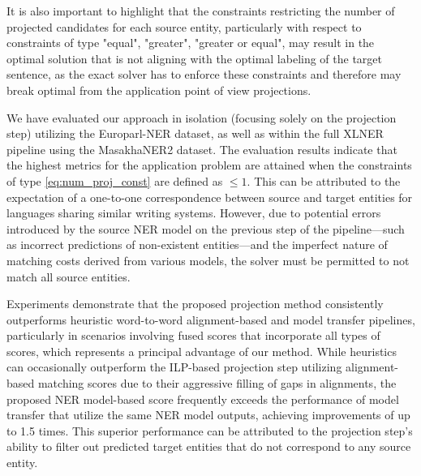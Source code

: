 It is also important to highlight that the constraints restricting the number of projected candidates
for each source entity, particularly with respect to constraints of type "equal", "greater", "greater or equal", may result
in the optimal solution that is not aligning with the optimal labeling of the target sentence, as the
exact solver has to enforce these constraints and therefore may break optimal from the application
point of view projections.

We have evaluated our approach in isolation (focusing solely on the projection step) utilizing the
Europarl-NER dataset, as well as within the full XLNER pipeline using the MasakhaNER2 dataset.
The evaluation results indicate that the highest metrics for the application problem are attained when
the constraints of type \eqref{eq:num_proj_const} are defined as \( \leq 1 \). This can be attributed
to the expectation of a one-to-one correspondence between source and target entities for languages
sharing similar writing systems. However, due to potential errors introduced by the source NER
model on the previous step of the pipeline—such as incorrect predictions of non-existent entities—and
the imperfect nature of matching costs derived from various models, the solver must be permitted to
not match all source entities.

Experiments demonstrate that the proposed projection method consistently outperforms
heuristic word-to-word alignment-based and model transfer pipelines, particularly in scenarios
involving fused scores that incorporate all types of scores, which represents a principal advantage
of our method. While heuristics can occasionally outperform the ILP-based projection step utilizing
alignment-based matching scores due to their aggressive filling of gaps in alignments, the proposed
NER model-based score frequently exceeds the performance of model transfer that utilize the
same NER model outputs, achieving improvements of up to 1.5 times. This superior performance can be
attributed to the projection step's ability to filter out predicted target entities that do not
correspond to any source entity.

